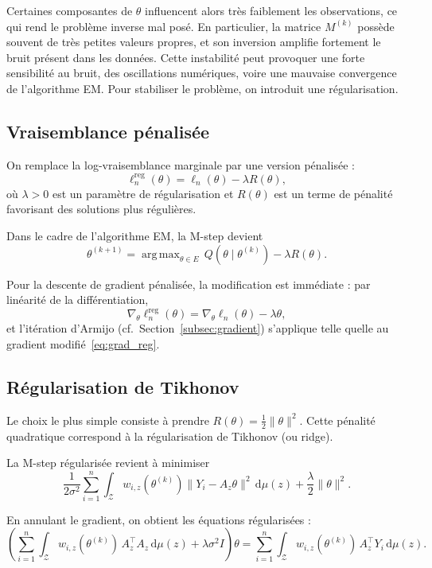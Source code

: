 \documentclass[12pt, a4paper]{article}
\theoremstyle{definition}
\newcommand{\Zcal}{\mathcal{Z}}
\DeclareMathOperator*{\argmax}{arg\,max}
\begin{document}
Certaines composantes de $\theta$ influencent alors très faiblement les observations,
ce qui rend le problème inverse mal posé. En particulier, la matrice $M^{(k)}$ possède
souvent de très petites valeurs propres, et son inversion amplifie fortement le bruit
présent dans les données. Cette instabilité peut provoquer une forte sensibilité au
bruit, des oscillations numériques, voire une mauvaise convergence de l’algorithme EM.
Pour stabiliser le problème, on introduit une régularisation.

\subsection{Vraisemblance pénalisée}
\label{subsec:vrai_penalisee}

On remplace la log-vraisemblance marginale par une version pénalisée :
\[
\ell_n^{\mathrm{reg}}(\theta)
=
\ell_n(\theta) - \lambda R(\theta),
\]
où $\lambda > 0$ est un paramètre de régularisation et $R(\theta)$ est un terme de
pénalité favorisant des solutions plus régulières.

Dans le cadre de l’algorithme EM, la M-step devient
\[
\theta^{(k+1)}
=
\argmax_{\theta \in E}
\,Q(\theta \mid \theta^{(k)}) - \lambda R(\theta).
\]

Pour la descente de gradient pénalisée, la modification est immédiate : par linéarité
de la différentiation,
\begin{equation}
  \label{eq:grad_reg}
  \nabla_\theta \ell_n^{\mathrm{reg}}(\theta) = \nabla_\theta \ell_n(\theta) - \lambda\theta,
\end{equation}
et l’itération d’Armijo (cf.~Section~\ref{subsec:gradient}) s’applique telle quelle
au gradient modifié~\eqref{eq:grad_reg}.

\subsection{Régularisation de Tikhonov}
\label{subsec:tikhonov}

Le choix le plus simple consiste à prendre $R(\theta) = \tfrac{1}{2}\|\theta\|^2$.
Cette pénalité quadratique correspond à la régularisation de Tikhonov (ou ridge).

La M-step régularisée revient à minimiser
\[
\frac{1}{2\sigma^2}
\sum_{i=1}^n \int_{\Zcal}
w_{i,z}(\theta^{(k)})
\|Y_i - A_z\theta\|^2
\,\mathrm{d}\mu(z)
+
\frac{\lambda}{2}\|\theta\|^2.
\]

En annulant le gradient, on obtient les équations régularisées :
\[
\left(
\sum_{i=1}^n \int_{\Zcal}
w_{i,z}(\theta^{(k)})\,
A_z^\top A_z
\,\mathrm{d}\mu(z)
+
\lambda\sigma^2 I
\right)\theta
=
\sum_{i=1}^n \int_{\Zcal}
w_{i,z}(\theta^{(k)})\,
A_z^\top Y_i
\,\mathrm{d}\mu(z).
\]
\end{document}
